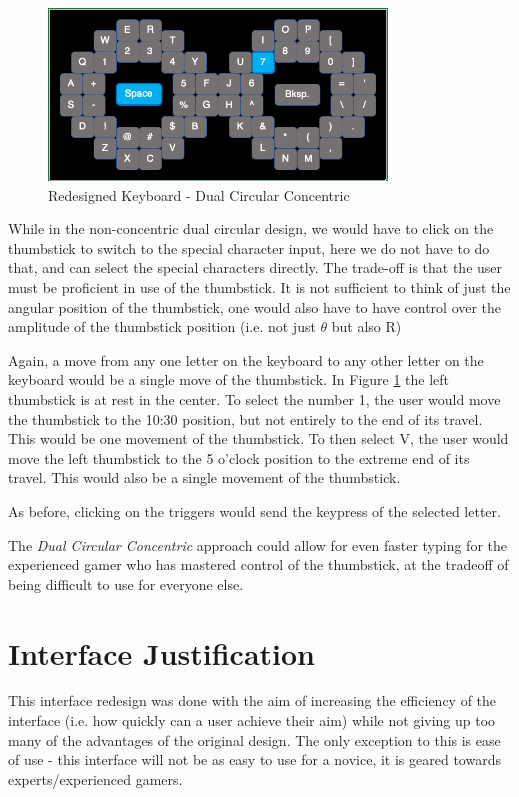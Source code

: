 \documentclass[
	letterpaper, %
]{jdf}
\begin{document}
\begin{figure}[h]
	\centering
	\includegraphics[width=9cm]{jdf-master/Figures/dual-circular-concentric-keyboard.png}
	\caption{Redesigned Keyboard - Dual Circular Concentric}
	\label{fig:circular-concentric-keyboard}
\end{figure}

While in the non-concentric dual circular design, we would have to click on the thumbstick to switch to the special character input, here we do not have to do that, and can select the special characters directly. The trade-off is that the user must be proficient in use of the thumbstick. It is not sufficient to think of just the angular position of the thumbstick, one would also have to have control over the amplitude of the thumbstick position (i.e. not just $\theta$ but also R)

Again, a move from any one letter on the keyboard to any other letter on the keyboard would be a single move of the thumbstick. In Figure \ref{fig:circular-concentric-keyboard} the left thumbstick is at rest in the center. To select the number 1, the user would move the thumbstick to the 10:30 position, but not entirely to the end of its travel. This would be one movement of the thumbstick. To then select V, the user would move the left thumbstick to the 5 o'clock position to the extreme end of its travel. This would also be a single movement of the thumbstick.

As before, clicking on the triggers would send the keypress of the selected letter.

The \textit{Dual Circular Concentric} approach could allow for even faster typing for the experienced gamer who has mastered control of the thumbstick, at the tradeoff of being difficult to use for everyone else.

\section{Interface Justification}
This interface redesign was done with the aim of increasing the efficiency of the interface (i.e. how quickly can a user achieve their aim) while not giving up too many of the advantages of the original design. The only exception to this is ease of use - this interface will not be as easy to use for a novice, it is geared towards experts/experienced gamers.
\end{document}
